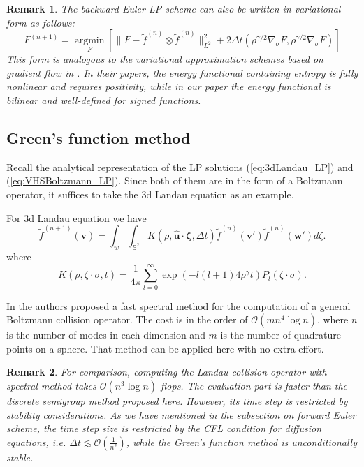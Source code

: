 \documentclass{article}
\newtheorem{remark}{Remark}
\numberwithin{equation}{section}
\DeclareMathOperator*{\argmin}{argmin}
\begin{document}
\begin{remark}
    The backward Euler LP scheme can also be written in variational form as follows:
    \begin{equation*}
        F^{(n+1)} = \argmin\limits_{F} \left[\lVert F - \widetilde{f}^{(n)}\otimes \widetilde{f}^{(n)}\rVert^{2}_{L^{2}} + 2\Delta t \left( \rho^{\gamma/2}\nabla_{\sigma} F, \rho^{\gamma/2}\nabla_{\sigma} F\right)\right]
    \end{equation*}
    This form is analogous to the variational approximation schemes based on gradient flow in \cite{erbar2023gradient, carrillo2024landau}. In their papers, the energy functional containing entropy is fully nonlinear and requires positivity, while in our paper the energy functional is bilinear and well-defined for signed functions.
\end{remark}

\subsection{Green's function method}
Recall the analytical representation of the LP solutions (\ref{eq:3dLandau_LP}) and (\ref{eq:VHSBoltzmann_LP}). Since both of them are in the form of a Boltzmann operator, it suffices to take the 3d Landau equation as an example.

For 3d Landau equation we have
\begin{equation*}
    \widetilde{f}^{(n+1)} (\mathbf{v}) = \int_{w}\int_{\mathbb{S}^{2}} K(\rho,\widehat{\mathbf{u}}\cdot \mathbf{\zeta},\Delta t)\widetilde{f}^{(n)}(\mathbf{v}') \widetilde{f}^{(n)}(\mathbf{w}') d\zeta.
\end{equation*}
where
\begin{equation*}
    K(\rho,\zeta\cdot\sigma, t) = \frac{1}{4\pi}\sum_{l=0}^{\infty} \exp(-l(l+1)4\rho^{\gamma}t)P_{l}(\zeta\cdot\sigma).
\end{equation*}

In \cite{gamba2017fast} the authors proposed a fast spectral method for the computation of a general Boltzmann collision operator. The cost is in the order of $\mathcal{O}(m n^{4}\log n)$, where $n$ is the number of modes in each dimension and $m$ is the number of quadrature points on a sphere. That method can be applied here with no extra effort.

\begin{remark}
    For comparison, computing the Landau collision operator with spectral method \cite{pareschi2000fast} takes $\mathcal{O}(n^{3}\log n)$ flops. The evaluation part is faster than the discrete semigroup method proposed here. However, its time step is restricted by stability considerations. As we have mentioned in the subsection on forward Euler scheme, the time step size is restricted by the CFL condition for diffusion equations, i.e. $\Delta t \lesssim \mathcal{O}(\frac{1}{n^{2}})$, while the Green's function method is unconditionally stable.
\end{remark}
\end{document}
